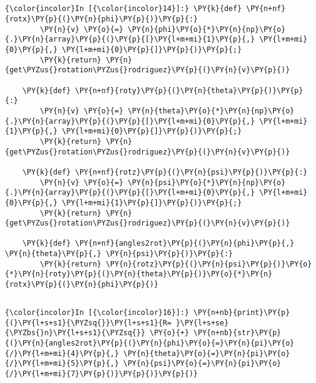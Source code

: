 \documentclass[a4paper]{scrreprt}
\begin{document}
\subsection{}\label{a}

\begin{Verbatim}[commandchars=\\\{\}]
{\color{incolor}In [{\color{incolor}14}]:} \PY{k}{def} \PY{n+nf}{rotx}\PY{p}{(}\PY{n}{phi}\PY{p}{)}\PY{p}{:}
	    \PY{n}{v} \PY{o}{=} \PY{n}{phi}\PY{o}{*}\PY{n}{np}\PY{o}{.}\PY{n}{array}\PY{p}{(}\PY{p}{[}\PY{l+m+mi}{1}\PY{p}{,} \PY{l+m+mi}{0}\PY{p}{,} \PY{l+m+mi}{0}\PY{p}{]}\PY{p}{)}\PY{p}{;} 
	    \PY{k}{return} \PY{n}{get\PYZus{}rotation\PYZus{}rodriguez}\PY{p}{(}\PY{n}{v}\PY{p}{)}
	
	\PY{k}{def} \PY{n+nf}{roty}\PY{p}{(}\PY{n}{theta}\PY{p}{)}\PY{p}{:}
	    \PY{n}{v} \PY{o}{=} \PY{n}{theta}\PY{o}{*}\PY{n}{np}\PY{o}{.}\PY{n}{array}\PY{p}{(}\PY{p}{[}\PY{l+m+mi}{0}\PY{p}{,} \PY{l+m+mi}{1}\PY{p}{,} \PY{l+m+mi}{0}\PY{p}{]}\PY{p}{)}\PY{p}{;} 
	    \PY{k}{return} \PY{n}{get\PYZus{}rotation\PYZus{}rodriguez}\PY{p}{(}\PY{n}{v}\PY{p}{)}
	
	\PY{k}{def} \PY{n+nf}{rotz}\PY{p}{(}\PY{n}{psi}\PY{p}{)}\PY{p}{:}
	    \PY{n}{v} \PY{o}{=} \PY{n}{psi}\PY{o}{*}\PY{n}{np}\PY{o}{.}\PY{n}{array}\PY{p}{(}\PY{p}{[}\PY{l+m+mi}{0}\PY{p}{,} \PY{l+m+mi}{0}\PY{p}{,} \PY{l+m+mi}{1}\PY{p}{]}\PY{p}{)}\PY{p}{;} 
	    \PY{k}{return} \PY{n}{get\PYZus{}rotation\PYZus{}rodriguez}\PY{p}{(}\PY{n}{v}\PY{p}{)} 
	
	\PY{k}{def} \PY{n+nf}{angles2rot}\PY{p}{(}\PY{n}{phi}\PY{p}{,} \PY{n}{theta}\PY{p}{,} \PY{n}{psi}\PY{p}{)}\PY{p}{:} 
	    \PY{k}{return} \PY{n}{rotz}\PY{p}{(}\PY{n}{psi}\PY{p}{)}\PY{o}{*}\PY{n}{roty}\PY{p}{(}\PY{n}{theta}\PY{p}{)}\PY{o}{*}\PY{n}{rotx}\PY{p}{(}\PY{n}{phi}\PY{p}{)}
\end{Verbatim}


\subsection{}\label{b}

\begin{Verbatim}[commandchars=\\\{\}]
{\color{incolor}In [{\color{incolor}16}]:} \PY{n+nb}{print}\PY{p}{(}\PY{l+s+s1}{\PYZsq{}}\PY{l+s+s1}{R= }\PY{l+s+se}{\PYZbs{}n}\PY{l+s+s1}{\PYZsq{}} \PY{o}{+} \PY{n+nb}{str}\PY{p}{(}\PY{n}{angles2rot}\PY{p}{(}\PY{n}{phi}\PY{o}{=}\PY{n}{pi}\PY{o}{/}\PY{l+m+mi}{4}\PY{p}{,} \PY{n}{theta}\PY{o}{=}\PY{n}{pi}\PY{o}{/}\PY{l+m+mi}{5}\PY{p}{,} \PY{n}{psi}\PY{o}{=}\PY{n}{pi}\PY{o}{/}\PY{l+m+mi}{7}\PY{p}{)}\PY{p}{)}\PY{p}{)}
\end{Verbatim}
\end{document}
